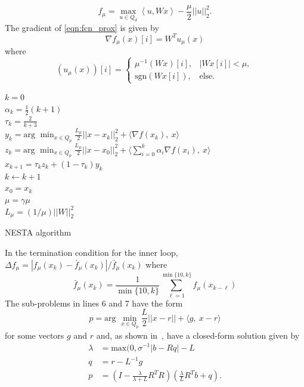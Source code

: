 \documentclass[twocolumn,twoside]{IEEEtran/IEEEtran}
\begin{document}
\begin{equation}
  f_{\mu} = \max_{u\in Q_d} \left\langle u,
    W x \right\rangle - \frac{\mu}{2}||u||_2^2. \label{eqn:fcn_prox}
\end{equation}
The gradient of \eqref{eqn:fcn_prox} is given by
\begin{equation*}
  \nabla f_{\mu}(x)[i] = W^Tu_{\mu}(x)
\end{equation*}
where
\begin{equation*}
  (u_{\mu}(x))[i] = 
\begin{cases}
    \mu^{-1}(Wx)[i], & |W x[i]| < \mu,\\
    \text{sgn}(W x[i]), & \text{else}.
  \end{cases}
\end{equation*}

\begin{algorithm}
   
		
   {
    $k=0$\\
       {
        $\alpha_k = \frac{1}{2}(k+1)$ \\
        $\tau_k = \frac{2}{k+3}$ \\
        $\displaystyle y_k = \text{arg } \min_{x\in Q_p}
          \frac{L_{\mu}}{2}||x - x_k||_2^2 + \langle \nabla f(x_k),~ x\rangle$\\
        $\displaystyle {z_k = \text{arg } \min_{x\in Q_p} \frac{L_{\mu}}{2}||x-x_0||_2^2 +
        \langle \sum_{i=0}^k \alpha_i \nabla f(x_i), ~x \rangle}$\\
        $x_{k+1} = \tau_kz_k + (1-\tau_k)y_k$\\
        $k \leftarrow k + 1$\\
      }
      $x_0 = x_k$\\
      $\mu = \gamma \mu$\\
      $L_{\mu} = (1/\mu)||W||^2_2$
    }
  \caption{NESTA algorithm}
  \label{ag:BPTV}
\end{algorithm}
In the termination condition for the inner loop, $\Delta f_{\mu} = |f_{\mu}(x_k) - \bar{f}_{\mu}(x_k)|/\bar{f}_{\mu}(x_k)$ where
\begin{equation}
\bar{f}_{\mu}(x_k) = \frac{1}{\min\{10, k\}} \sum_{\ell=1}^{\min\{10,k\}} f_{\mu}(x_{k-\ell})
\end{equation}
The sub-problems in lines 6 and 7 have the form
\begin{equation}
  p = \textrm{arg } \min_{x\in Q_p} \frac{L}{2}||x - r|| + \langle g,~x - r\rangle
\end{equation}
for some vectors $g$ and $r$ and, as shown in~\cite{becker_nesta_2011}, have a closed-form solution given by
\begin{align}
  \lambda & = \textrm{max}(0, \sigma^{-1}\left| b - Rq\right| - L\\
  q &= r - L^{-1}g\\
  p &= \left(I - \frac{\lambda}{\lambda + L} R^TR\right)\left( \frac{\lambda}{L}R^Tb + q\right).
\end{align}
\end{document}
